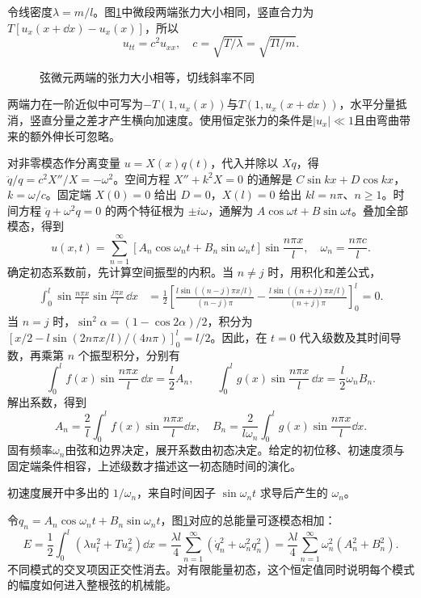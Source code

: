 \begin{solution}
令线密度$\lambda=m/l$。图\ref{fig:hw7-6-s}中微段两端张力大小相同，竖直合力为$T[u_x(x+\dd x)-u_x(x)]$，所以
\[
 u_{tt}=c^2u_{xx},\quad c=\sqrt{T/\lambda}=\sqrt{Tl/m}.
\]

\begin{figure}[H]\centering
{}
\caption{弦微元两端的张力大小相等，切线斜率不同}\label{fig:hw7-6-s}
\end{figure}

两端力在一阶近似中可写为$-T(1,u_x(x))$与$T(1,u_x(x+\dd x))$，水平分量抵消，竖直分量之差才产生横向加速度。使用恒定张力的条件是$|u_x|\ll1$且由弯曲带来的额外伸长可忽略。

对非零模态作分离变量 $u=X(x)q(t)$，代入并除以 $Xq$，得 $\ddot q/q=c^2X''/X=-\omega^2$。空间方程 $X''+k^2X=0$ 的通解是 $C\sin kx+D\cos kx$，$k=\omega/c$。固定端 $X(0)=0$ 给出 $D=0$，$X(l)=0$ 给出 $kl=n\pi$、$n\ge1$。时间方程 $\ddot q+\omega^2q=0$ 的两个特征根为 $\pm i\omega$，通解为 $A\cos\omega t+B\sin\omega t$。叠加全部模态，得到
\[
 \boxed{u(x,t)=\sum_{n=1}^\infty
 [A_n\cos\omega_nt+B_n\sin\omega_nt]\sin\frac{n\pi x}{l},
 \quad\omega_n=\frac{n\pi c}{l}}.
\]
确定初态系数前，先计算空间振型的内积。当 $n\ne j$ 时，用积化和差公式，
\[
\begin{aligned}
\int_0^l\sin\frac{n\pi x}{l}\sin\frac{j\pi x}{l}\,\dd x
&=\frac12\left[\frac{l\sin((n-j)\pi x/l)}{(n-j)\pi}
-\frac{l\sin((n+j)\pi x/l)}{(n+j)\pi}\right]_0^l=0.
\end{aligned}
\]
当 $n=j$ 时，$\sin^2\alpha=(1-\cos2\alpha)/2$，积分为 $[x/2-l\sin(2n\pi x/l)/(4n\pi)]_0^l=l/2$。因此，在 $t=0$ 代入级数及其时间导数，再乘第 $n$ 个振型积分，分别有
\[
\int_0^lf(x)\sin\frac{n\pi x}{l}\,\dd x=\frac l2A_n,\qquad
\int_0^lg(x)\sin\frac{n\pi x}{l}\,\dd x=\frac l2\omega_nB_n.
\]
解出系数，得到
\[
 A_n=\frac2l\int_0^lf(x)\sin\frac{n\pi x}{l}\dd x,\quad
 B_n=\frac2{l\omega_n}\int_0^lg(x)\sin\frac{n\pi x}{l}\dd x.
\]
固有频率$\omega_n$由弦和边界决定，展开系数由初态决定。给定的初位移、初速度须与固定端条件相容，上述级数才描述这一初态随时间的演化。


初速度展开中多出的 $1/\omega_n$，来自时间因子 $\sin\omega_nt$ 求导后产生的 $\omega_n$。

令$q_n=A_n\cos\omega_nt+B_n\sin\omega_nt$，图\ref{fig:hw7-6-s}对应的总能量可逐模态相加：
\[
 E=\frac12\int_0^l(\lambda u_t^2+Tu_x^2)\dd x
 =\frac{\lambda l}{4}\sum_{n=1}^\infty
 (\dot q_n^2+\omega_n^2q_n^2)
 =\frac{\lambda l}{4}\sum_{n=1}^\infty\omega_n^2(A_n^2+B_n^2).
\]
不同模式的交叉项因正交性消去。对有限能量初态，这个恒定值同时说明每个模式的幅度如何进入整根弦的机械能。

\end{solution}



